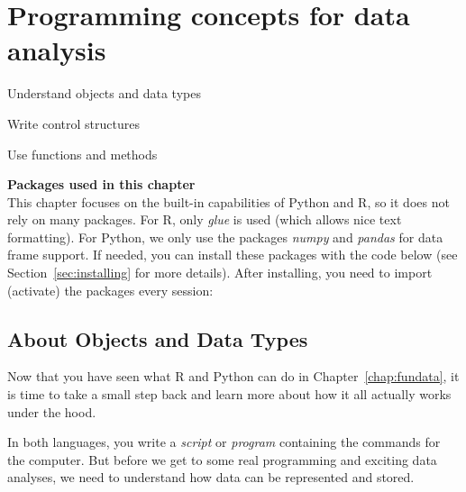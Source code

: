 \chapter{Programming concepts for data analysis}
\label{chap:programmingconcepts}

\begin{abstract}{Abstract}
  This chapter introduces readers to the basics of programming, data types, control structures, and functions
  in Python and R. It
explains how to deal with objects, statements, expressions, variables
and different types of data, and shows how to create and understand
simple control structures such as loops and conditions.
\end{abstract}


\begin{objectives}
\item Understand objects and data types
\item Write control structures
\item Use functions and methods
\end{objectives}

\newpage
\begin{feature}
  \textbf{Packages used in this chapter}\\
  This chapter focuses on the built-in capabilities of Python and R,
  so it does not rely on many packages.
  For R, only \emph{glue} is used (which allows nice text formatting).
  For Python, we only use the packages \emph{numpy} and \emph{pandas}
  for data frame support.
  If needed, you can install these packages with the code below
  (see Section~\ref{sec:installing} for more details).
  \noindent After installing, you need to import (activate) the packages every session:
\end{feature}


\section{About Objects and Data Types}
\label{sec:datatypes}

Now that you have seen what R and Python can do in Chapter~\ref{chap:fundata},
it is time to take a small step back and learn more about how it all actually works under the hood.

In both languages, you write a
\emph{script} or \emph{program} containing the commands for the
computer.  But before we get to
some real programming and exciting data analyses, we need to understand
how data can be represented and stored.

